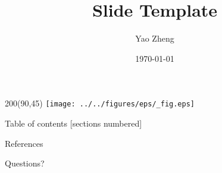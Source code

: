 \documentclass[10pt, aspectratio=169]{beamer}
\title{Slide Template}
\date{\today}
\author{Yao Zheng}
\institute{Virginia Tech}
\begin{document}
\begin{frame}
   \titlepage
   \begin{textblock}{200}(90,45)
    \texttt{[image: ../../figures/eps/\_fig.eps]}
   \end{textblock}
\end{frame}

\begin{acronym}

\end{acronym}


\begin{frame}{Table of contents}
  [sections numbered]
  \tableofcontents[hideallsubsections]
\end{frame}

\begin{frame}[allowframebreaks]{References}
\nocite{*}
\printbibliography[heading=none]
\end{frame}

\begin{frame}[standout]
\Huge{Questions?}
\end{frame}
\end{document}
